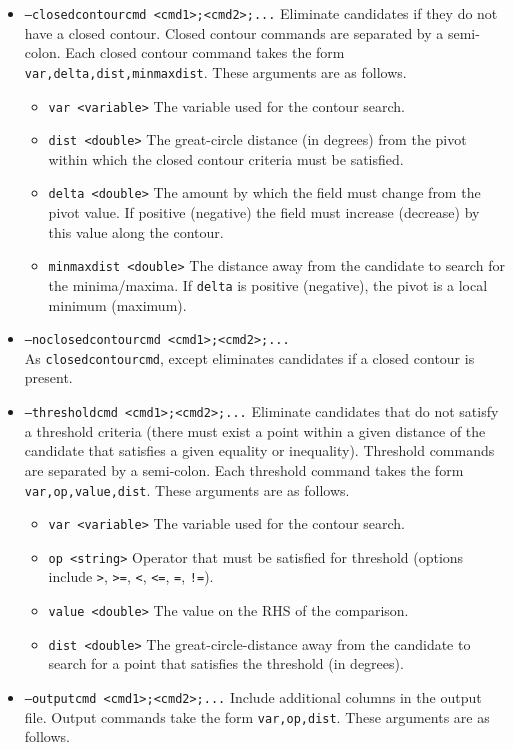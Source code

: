 \documentclass[gmdd, hvmath, online]{copernicus_discussions}
\begin{document}
\begin{itemize}
\item[] \texttt{--closedcontourcmd <cmd1>;<cmd2>;...} Eliminate candidates if they do not have a closed contour.  Closed contour commands are separated by a semi-colon.  Each closed contour command takes the form \texttt{var,delta,dist,minmaxdist}.  These arguments are as follows.
\begin{itemize}
\item[] \texttt{var <variable>}  The variable used for the contour search.
\item[] \texttt{dist <double>}  The great-circle distance (in degrees) from the pivot within which the closed contour criteria must be satisfied.
\item[] \texttt{delta <double>}  The amount by which the field must change from the pivot value.  If positive (negative) the field must increase (decrease) by this value along the contour.
\item[] \texttt{minmaxdist <double>}  The distance away from the candidate to search for the minima/maxima.  If \texttt{delta} is positive (negative), the pivot is a local minimum (maximum).
\end{itemize}
\item[] \texttt{--noclosedcontourcmd <cmd1>;<cmd2>;...} \\ As \texttt{closedcontourcmd}, except eliminates candidates if a closed contour is present.
\item[] \texttt{--thresholdcmd <cmd1>;<cmd2>;...}  Eliminate candidates that do not satisfy a threshold criteria (there must exist a point within a given distance of the candidate that satisfies a given equality or inequality).  Threshold commands are separated by a semi-colon.  Each threshold command takes the form \texttt{var,op,value,dist}.  These arguments are as follows.
\begin{itemize}
\item[] \texttt{var <variable>}  The variable used for the contour search.
\item[] \texttt{op <string>}  Operator that must be satisfied for threshold (options include \texttt{>}, \texttt{>=}, \texttt{<}, \texttt{<=}, \texttt{=}, \texttt{!=}).
\item[] \texttt{value <double>}  The value on the RHS of the comparison.
\item[] \texttt{dist <double>}  The great-circle-distance away from the candidate to search for a point that satisfies the threshold (in degrees).
\end{itemize}
\item[] \texttt{--outputcmd <cmd1>;<cmd2>;...}  Include additional columns in the output file.  Output commands take the form \texttt{var,op,dist}. These arguments are as follows.

\end{itemize}
\end{document}
